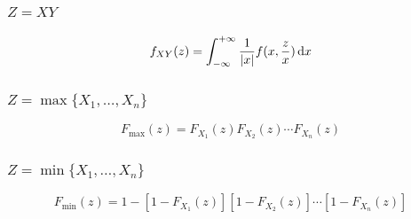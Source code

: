 \subsubsection{$Z=XY$}
\[f_{XY}(z)=\displaystyle\int_{-\infty}^{+\infty}\dfrac{1}{|x|}f(x,\dfrac{z}{x})\,\mathrm{d} x\]

\subsubsection{$Z=\max\{X_1,\ldots,X_n\}$}
\[F_{\max}(z)=F_{X_1}(z)F_{X_2}(z)\cdots F_{X_n}(z)\]

\subsubsection{$Z=\min\{X_1,\ldots,X_n\}$}
\[F_{\min}(z)=1-[1-F_{X_1}(z)][1-F_{X_2}(z)]\cdots [1-F_{X_n}(z)]\]

